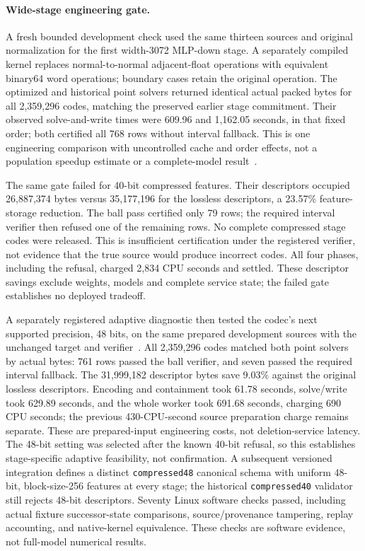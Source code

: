 \documentclass[10pt,twocolumn,letterpaper]{article}
\begin{document}
\paragraph{Wide-stage engineering gate.}
A fresh bounded development check used the same thirteen sources and original
normalization for the first width-3072 MLP-down stage. A separately compiled
kernel replaces normal-to-normal adjacent-float operations with equivalent
binary64 word operations; boundary cases retain the original operation.
The optimized and historical point solvers returned identical actual packed
bytes for all 2,359,296 codes, matching the preserved earlier stage commitment.
Their observed solve-and-write times were 609.96 and 1,162.05 seconds, in that
fixed order; both certified all 768 rows without interval fallback. This is one
engineering comparison with uncontrolled cache and order effects, not a
population speedup estimate or a complete-model result~\cite{v51}.

The same gate failed for 40-bit compressed features. Their descriptors occupied
26,887,374 bytes versus 35,177,196 for the lossless descriptors, a 23.57\%
feature-storage reduction. The ball pass certified only 79 rows; the required
interval verifier then refused one of the remaining rows. No complete
compressed stage codes were released. This is insufficient certification under
the registered verifier, not evidence that the true source would produce
incorrect codes. All four phases, including the refusal, charged 2,834 CPU
seconds and settled. These descriptor savings exclude weights, models and
complete service state; the failed gate establishes no deployed tradeoff.

A separately registered adaptive diagnostic then tested the codec's next
supported precision, 48 bits, on the same prepared development sources with
the unchanged target and verifier~\cite{v52}. All 2,359,296 codes matched both
point solvers by actual bytes: 761 rows passed the ball verifier, and seven
passed the required interval fallback. The 31,999,182 descriptor bytes save
9.03\% against the original lossless descriptors. Encoding and containment took
61.78 seconds, solve/write took 629.89 seconds, and the whole worker took
691.68 seconds, charging 690 CPU seconds; the previous 430-CPU-second source
preparation charge remains separate. These are prepared-input engineering
costs, not deletion-service latency. The 48-bit setting was selected after the
known 40-bit refusal, so this establishes stage-specific adaptive feasibility,
not confirmation. A subsequent versioned integration defines a distinct
\texttt{compressed48} canonical schema with uniform 48-bit, block-size-256
features at every stage; the historical \texttt{compressed40} validator still
rejects 48-bit descriptors. Seventy Linux software checks passed, including
actual fixture successor-state comparisons, source/provenance tampering,
replay accounting, and native-kernel equivalence. These checks are software
evidence, not full-model numerical results.
\end{document}
